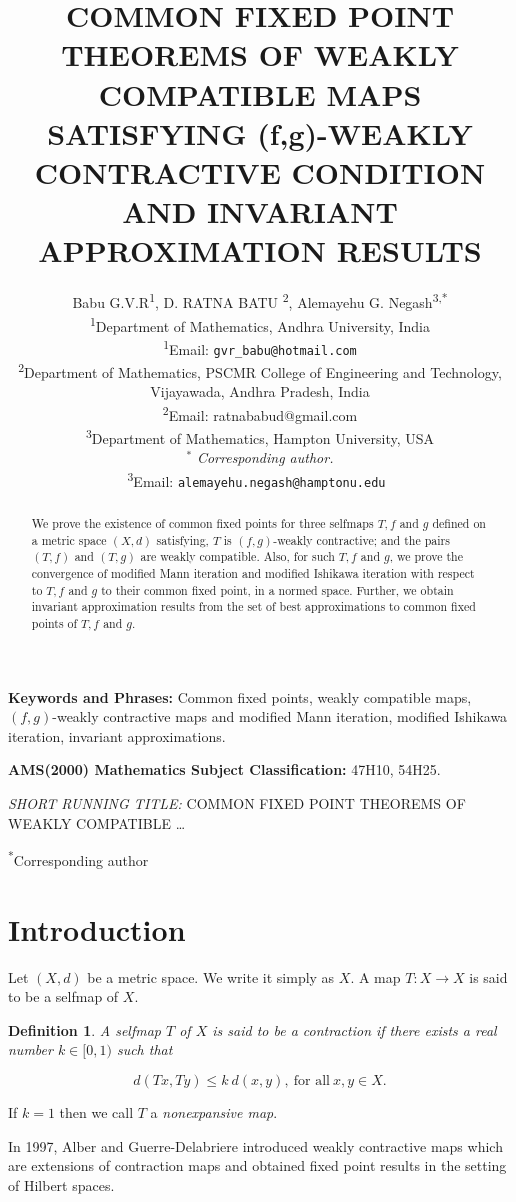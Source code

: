 \documentclass[11]{article}
\title{COMMON FIXED POINT THEOREMS OF WEAKLY COMPATIBLE MAPS SATISFYING  (f,g)-WEAKLY CONTRACTIVE CONDITION AND  INVARIANT APPROXIMATION RESULTS}
\author{Babu G.V.R\textsuperscript{1},  D. RATNA BATU \textsuperscript{2},  Alemayehu G. Negash\textsuperscript{3,*}\\
\small \textsuperscript{1}Department of Mathematics, Andhra University, India\\
\small \textsuperscript{1}Email: \texttt{gvr\_babu@hotmail.com} 
\\
\small \textsuperscript{2}Department of Mathematics, PSCMR College of Engineering and Technology, Vijayawada,
Andhra Pradesh, India\\
\small \textsuperscript{2}Email: ratnababud@gmail.com\\
\small \textsuperscript{3}Department of Mathematics, Hampton University, USA\\
$^*$ \textit{Corresponding author.} \\
\small \textsuperscript{3}Email: \texttt{alemayehu.negash@hamptonu.edu}\
}
\date{}
\newtheorem{definition}{Definition}[section]
\numberwithin{equation}{definition}
\begin{document}
\maketitle

\begin{abstract}
We prove the existence of common fixed points for three selfmaps $T,f$ and $g$ defined on a metric space $(X,d)$ satisfying, $T$ is $(f,g)$-weakly contractive; and the pairs $(T,f)$ and $(T,g)$ are weakly compatible. Also, for such $T,f$ and $g$, we prove the convergence of modified Mann iteration and modified Ishikawa iteration with respect to $T,f$ and $g$ to their common fixed point, in a normed space. Further, we obtain invariant approximation results from the set of best approximations to common fixed points of $T,f$ and $g$.
\end{abstract}

\textbf{Keywords and Phrases:} Common fixed points, weakly compatible maps, $(f,g)$-weakly contractive maps and modified Mann iteration, modified Ishikawa iteration, invariant approximations.

\textbf{AMS(2000) Mathematics Subject Classification:} 47H10, 54H25.

\emph{SHORT RUNNING TITLE:} COMMON FIXED POINT THEOREMS OF WEAKLY COMPATIBLE \ldots

\textsuperscript{*}Corresponding author

\section{Introduction}

Let $(X,d)$ be a metric space. We write it simply as $X$. A map $T:X\to X$ is said to be a selfmap of $X$.

\begin{definition}
A selfmap $T$ of $X$ is said to be a \emph{contraction} if there exists a real number $k\in[0,1)$ such that
\end{definition}


\begin{equation}
d(Tx,Ty)\leq k\ d(x,y),\ \text{for all}\ x,y\in X.
\end{equation}

If $k=1$ then we call $T$ a \emph{nonexpansive map}.

In 1997, Alber and Guerre-Delabriere \cite{Alber1997} introduced weakly contractive maps which are extensions of contraction maps and obtained fixed point results in the setting of Hilbert spaces.
\end{document}
